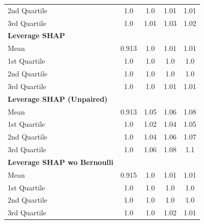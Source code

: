 {\begin{tabular} {lcccc}
\hspace{7pt}2nd Quartile & 1.0 & 1.0 & 1.01 & 1.01 \\
\hspace{7pt}3rd Quartile & 1.0 & 1.01 & 1.03 & 1.02 \\
\addlinespace[1ex]
\textbf{Leverage SHAP} &  &  &  &  \\
\hspace{7pt}Mean & \cellcolor{silver!60}0.913 & \cellcolor{silver!60}1.0 & \cellcolor{gold!60}1.01 & \cellcolor{gold!60}1.01 \\
\hspace{7pt}1st Quartile & \cellcolor{bronze!60}1.0 & \cellcolor{gold!60}1.0 & \cellcolor{gold!60}1.0 & \cellcolor{gold!60}1.0 \\
\hspace{7pt}2nd Quartile & \cellcolor{silver!60}1.0 & \cellcolor{silver!60}1.0 & \cellcolor{gold!60}1.0 & \cellcolor{silver!60}1.0 \\
\hspace{7pt}3rd Quartile & \cellcolor{silver!60}1.0 & \cellcolor{gold!60}1.0 & \cellcolor{silver!60}1.01 & \cellcolor{gold!60}1.01 \\
\addlinespace[1ex]
\textbf{Leverage SHAP (Unpaired)} &  &  &  &  \\
\hspace{7pt}Mean & 0.913 & 1.05 & 1.06 & 1.08 \\
\hspace{7pt}1st Quartile & \cellcolor{bronze!60}1.0 & 1.02 & 1.04 & 1.05 \\
\hspace{7pt}2nd Quartile & \cellcolor{silver!60}1.0 & 1.04 & 1.06 & 1.07 \\
\hspace{7pt}3rd Quartile & \cellcolor{silver!60}1.0 & 1.06 & 1.08 & 1.1 \\
\addlinespace[1ex]
\textbf{Leverage SHAP wo Bernoulli} &  &  &  &  \\
\hspace{7pt}Mean & 0.915 & 1.0 & \cellcolor{bronze!60}1.01 & \cellcolor{bronze!60}1.01 \\
\hspace{7pt}1st Quartile & 1.0 & \cellcolor{bronze!60}1.0 & \cellcolor{bronze!60}1.0 & \cellcolor{bronze!60}1.0 \\
\hspace{7pt}2nd Quartile & 1.0 & \cellcolor{bronze!60}1.0 & \cellcolor{bronze!60}1.0 & \cellcolor{bronze!60}1.0 \\
\hspace{7pt}3rd Quartile & 1.0 & 1.0 & \cellcolor{bronze!60}1.02 & \cellcolor{bronze!60}1.01 \\

\end{tabular}}
